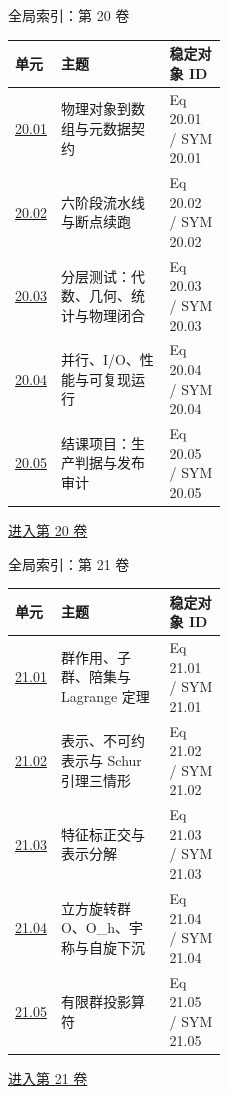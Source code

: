 \documentclass[aspectratio=169,10pt]{ctexbeamer}
\begin{document}
\begin{frame}[t]{全局索引：第 20 卷}
\small\begin{tabularx}{\linewidth}{p{0.15\linewidth}Yp{0.27\linewidth}}
\toprule 单元 & 主题 & 稳定对象 ID\\\midrule
\hyperlink{Fr:20.01-1}{20.01} & 物理对象到数组与元数据契约 & Eq 20.01 / SYM 20.01\\
\hyperlink{Fr:20.02-1}{20.02} & 六阶段流水线与断点续跑 & Eq 20.02 / SYM 20.02\\
\hyperlink{Fr:20.03-1}{20.03} & 分层测试：代数、几何、统计与物理闭合 & Eq 20.03 / SYM 20.03\\
\hyperlink{Fr:20.04-1}{20.04} & 并行、I/\allowbreak{}O、性能与可复现运行 & Eq 20.04 / SYM 20.04\\
\hyperlink{Fr:20.05-1}{20.05} & 结课项目：生产判据与发布审计 & Eq 20.05 / SYM 20.05\\
\bottomrule\end{tabularx}
\vfill\hyperlink{Fr:V20-title}{进入第 20 卷}
\end{frame}

\begin{frame}[t]{全局索引：第 21 卷}
\small\begin{tabularx}{\linewidth}{p{0.15\linewidth}Yp{0.27\linewidth}}
\toprule 单元 & 主题 & 稳定对象 ID\\\midrule
\hyperlink{Fr:21.01-1}{21.01} & 群作用、子群、陪集与 Lagrange 定理 & Eq 21.01 / SYM 21.01\\
\hyperlink{Fr:21.02-1}{21.02} & 表示、不可约表示与 Schur 引理三情形 & Eq 21.02 / SYM 21.02\\
\hyperlink{Fr:21.03-1}{21.03} & 特征标正交与表示分解 & Eq 21.03 / SYM 21.03\\
\hyperlink{Fr:21.04-1}{21.04} & 立方旋转群 O、O\_h、宇称与自旋下沉 & Eq 21.04 / SYM 21.04\\
\hyperlink{Fr:21.05-1}{21.05} & 有限群投影算符 & Eq 21.05 / SYM 21.05\\
\bottomrule\end{tabularx}
\vfill\hyperlink{Fr:V21-title}{进入第 21 卷}
\end{frame}
\end{document}
